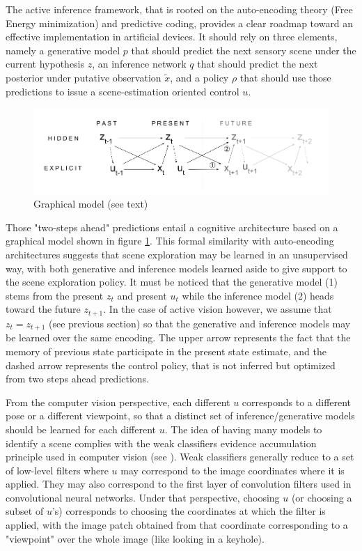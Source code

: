 \documentclass{article} %
\begin{document}
The active inference framework, that is rooted on the auto-encoding theory (Free Energy minimization) and predictive coding, provides a clear roadmap toward an effective implementation in artificial devices. It should rely on three elements, namely a generative model $p$ that should predict the next sensory scene under the current hypothesis $z$, an inference network $q$ that should predict the next posterior under putative observation $\tilde{x}$, and a policy $\rho$ that should use those predictions to issue a scene-estimation oriented control $u$.  

\begin{figure}[t!]
	\centerline{
		\includegraphics[width = \linewidth]{img/ICLR-graphical.png} 
	}
	\caption{Graphical model (see text)}\label{fig:graphical}
\end{figure}

Those "two-steps ahead" predictions entail a cognitive architecture based on a graphical model shown in figure \ref{fig:graphical}.
This formal similarity with auto-encoding architectures suggests that scene exploration may be learned in an unsupervised way, with both generative and inference models learned aside to give support to the scene exploration policy. It must be noticed that the generative model (1) stems from the present $z_t$ and present $u_t$ while the inference model (2) heads toward the future $z_{t+1}$.  In the case of active vision however, we assume that $z_t = z_{t+1}$ (see previous section) so that the generative and inference models may be learned over the same encoding. The upper arrow represents the fact that the memory of previous state participate in the present state estimate, and the dashed arrow represents the control policy, that is not inferred but optimized from two steps ahead predictions.

From the computer vision perspective, each different $u$ corresponds to a different pose or a different viewpoint, so that a distinct set of inference/generative models should be learned for each different $u$. The idea of having many models to identify a scene complies with the weak classifiers evidence accumulation principle used in computer vision (see \cite{viola2003fast}). Weak classifiers generally reduce to a set of low-level filters where $u$ may correspond to the image coordinates where it is applied. They may also correspond to the first layer of convolution filters used in convolutional neural networks. Under that perspective, choosing $u$ (or choosing a subset of $u$'s) corresponds to choosing the coordinates at which the filter is applied, with the image patch obtained from that coordinate corresponding to a "viewpoint" over the whole image (like looking in a keyhole). 
\end{document}
